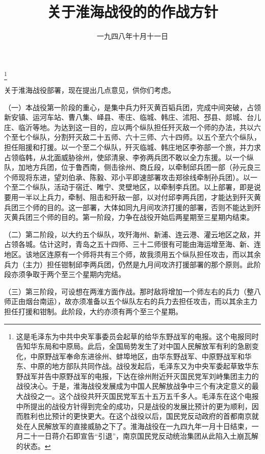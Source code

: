 
\title{关于淮海战役的的作战方针}
\date{一九四八年十月十一日}
\thanks{这是毛泽东为中共中央军事委员会起草的给华东野战军的电报。这个电报同时告知华东局和中原局。此后，全国局势发生了对中国人民解放军有利的急剧变化，中原野战军奉命东进徐州、蚌埠地区，由华东野战军、中原野战军和华东、中原的地方部队共同作战。战役发起后，毛泽东又为中央军委起草致华东野战军并告中原野战军的电报，下达在徐州附近歼灭国民党军刘峙集团主力的战役决心。于是，淮海战役发展成为中国人民解放战争中三个有决定意义的最大战役之一。这个战役共歼灭国民党军五十五万五千多人。毛泽东在这个电报中所提出的战役方针得到完全的成功，只是战役的发展比预计的更为顺利，因而胜利也比预计的更快更大。在这个战役以后，国民党反动政府的首都南京就处在人民解放军的直接威胁之下了。淮海战役在一九四九年一月十日结束，一月二十一日蒋介石即宣告“引退”，南京国民党反动统治集团从此陷入土崩瓦解的状态。}
\maketitle


关于淮海战役部署，现在提出几点意见，供你们考虑。

（一）本战役第一阶段的重心，是集中兵力歼灭黄百韬兵团，完成中间突破，占领新安镇、运河车站、曹八集、峄县、枣庄、临城、韩庄、沭阳、邳县、郯城、台儿庄、临沂等地。为达到这一目的，应以两个纵队担任歼灭敌一个师的办法，共以六个至七个纵队，分割歼灭敌二十五师、六十三师、六十四师。以五个至六个纵队，担任阻援和打援。以一个至二个纵队，歼灭临城、韩庄地区李弥部一个旅，并力求占领临韩，从北面威胁徐州，使邱清泉、李弥两兵团不敢以全力东援。以一个纵队，加地方兵团，位于鲁西南，侧击徐州、商丘段，以牵制邱兵团一部（孙元良三个师现将东进，望刘伯承、陈毅、邓小平即速部署攻击郑徐线牵制孙兵团）。以一个至二个纵队，活动于宿迁、睢宁、灵壁地区，以牵制李兵团。以上部署，即是说要用一半以上兵力，牵制、阻击和歼敌一部，以对付邱李两兵团，才能达到歼灭黄兵团三个师的目的。这一部署，大体如同九月间攻济打援的部署，否则不能达到歼灭黄兵团三个师的目的。第一阶段，力争在战役开始后两星期至三星期内结束。

（二）第二阶段，以大约五个纵队，攻歼海州、新浦、连云港、灌云地区之敌，并占领各城。估计这时，青岛之五十四师、三十二师很有可能由海运增至海、新、连地区。该地区连原有一个师将共有三个师，故我须用五个纵队担任攻击，而以其余兵力（主力）担任钳制邱李两兵团，仍然是九月间攻济打援部署的那个原则。此阶段亦须争取于两个至三个星期内完结。

（三）第三阶段，可设想在两淮方面作战。那时敌将增加一个师左右的兵力（整八师正由烟台南运），故亦须准备以五个纵队左右的兵力去担任攻击，而以其余主力担任打援和钳制。此阶段，大约亦须有两个至三个星期。

